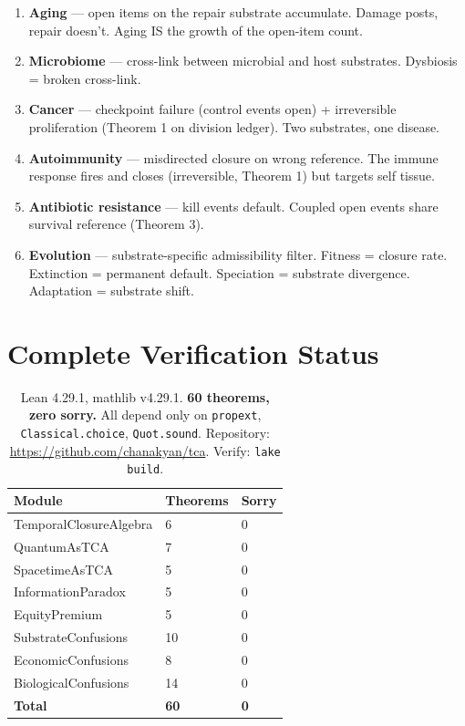 \documentclass[11pt]{article}
\begin{document}
\begin{enumerate}
\item \textbf{Aging} --- open items on the repair substrate accumulate. Damage posts, repair doesn't. Aging IS the growth of the open-item count.
\item \textbf{Microbiome} --- cross-link between microbial and host substrates. Dysbiosis = broken cross-link.
\item \textbf{Cancer} --- checkpoint failure (control events open) + irreversible proliferation (Theorem 1 on division ledger). Two substrates, one disease.
\item \textbf{Autoimmunity} --- misdirected closure on wrong reference. The immune response fires and closes (irreversible, Theorem 1) but targets self tissue.
\item \textbf{Antibiotic resistance} --- kill events default. Coupled open events share survival reference (Theorem 3).
\item \textbf{Evolution} --- substrate-specific admissibility filter. Fitness = closure rate. Extinction = permanent default. Speciation = substrate divergence. Adaptation = substrate shift.
\end{enumerate}


\clearpage

\section{Complete Verification Status}

\begin{table}[h]
\centering
\footnotesize
\begin{tabular}{@{}lll@{}}
\toprule
\textbf{Module} & \textbf{Theorems} & \textbf{Sorry} \\
\midrule
TemporalClosureAlgebra & 6 & 0 \\
QuantumAsTCA           & 7 & 0 \\
SpacetimeAsTCA         & 5 & 0 \\
InformationParadox     & 5 & 0 \\
EquityPremium          & 5 & 0 \\
SubstrateConfusions    & 10 & 0 \\
EconomicConfusions     & 8 & 0 \\
BiologicalConfusions   & 14 & 0 \\
\midrule
\textbf{Total}         & \textbf{60} & \textbf{0} \\
\bottomrule
\end{tabular}
\caption{Lean 4.29.1, mathlib v4.29.1. \textbf{60 theorems, zero sorry.}
All depend only on \texttt{propext}, \texttt{Classical.choice}, \texttt{Quot.sound}.
Repository: \url{https://github.com/chanakyan/tca}. Verify: \texttt{lake build}.}
\end{table}
\end{document}
